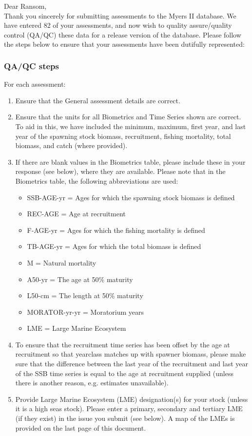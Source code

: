 \documentclass [a4paper, 10pt] {article}
\begin{document}
\noindent Dear Ransom,\\

\noindent Thank you sincerely for submitting assessments to the Myers II database. We have entered 82 of your assessments, and now wish to quality assure/quality control (QA/QC) these data for a release version of the database. Please follow the steps below to ensure that your assessments have been dutifully represented:
\subsubsection{QA/QC steps}
For each assessment:
\begin{enumerate}
\item Ensure that the General assessment details are correct.
\item Ensure that the units for all Biometrics and Time Series shown are correct. To aid in this, we have included the minimum, maximum, first year, and last year of the spawning stock biomass, recruitment, fishing mortality, total biomass, and  catch  (where provided). 
\item If there are blank values in the Biometrics table, please include these in your response (see below), where they are available.
Please note that in the Biometrics table, the following abbreviations are used:
\begin{itemize}
\item SSB-AGE-yr  = Ages for which the spawning stock biomass is defined
\item REC-AGE     = Age at recruitment
\item F-AGE-yr    = Ages for which the fishing mortality is defined 
\item TB-AGE-yr   = Ages for which the total biomass is defined
\item M      = Natural mortality
\item A50-yr      = The age at 50\% maturity
\item L50-cm      = The length at 50\% maturity
\item MORATOR-yr-yr = Moratorium years
\item LME = Large Marine Ecosystem\\
\end{itemize}
\item To ensure that the recruitment time series has been offset by the age at recruitment so that yearclass matches up with spawner biomass, please make sure that the difference between the last year of the recruitment and last year of the SSB time series is equal to the age at recruitment supplied (unless there is another reason, e.g. estimates unavailable). 
\item Provide Large Marine Ecosystem (LME) designation(s) for your stock (unless it is a high seas stock). Please enter a primary, secondary and tertiary LME (if they exist) in the issue you submit (see below). A map of the LMEs is provided on the last page of this document. 
\end{enumerate}
\vspace{-.25in}
\end{document}
